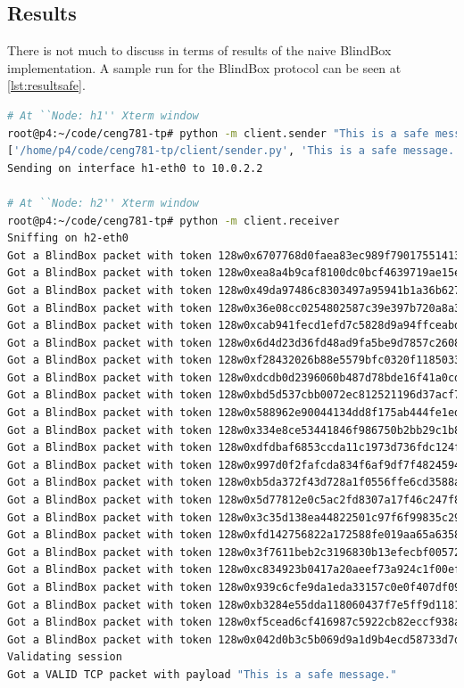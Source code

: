 \documentclass{winslabreport}
\begin{document}
\subsection{Results}

There is not much to discuss in terms of results of the naive BlindBox implementation. A sample run for the BlindBox protocol can be seen at \autoref{lst:resultsafe}.

\begin{lstlisting}[caption={A Safe Message},label={lst:resultsafe},language=bash]
# At ``Node: h1'' Xterm window
root@p4:~/code/ceng781-tp# python -m client.sender "This is a safe message."
['/home/p4/code/ceng781-tp/client/sender.py', 'This is a safe message.']
Sending on interface h1-eth0 to 10.0.2.2

# At ``Node: h2'' Xterm window
root@p4:~/code/ceng781-tp# python -m client.receiver
Sniffing on h2-eth0
Got a BlindBox packet with token 128w0x6707768d0faea83ec989f79017551413
Got a BlindBox packet with token 128w0xea8a4b9caf8100dc0bcf4639719ae15e
Got a BlindBox packet with token 128w0x49da97486c8303497a95941b1a36b627
Got a BlindBox packet with token 128w0x36e08cc0254802587c39e397b720a8a3
Got a BlindBox packet with token 128w0xcab941fecd1efd7c5828d9a94ffceabd
Got a BlindBox packet with token 128w0x6d4d23d36fd48ad9fa5be9d7857c2608
Got a BlindBox packet with token 128w0xf28432026b88e5579bfc0320f1185033
Got a BlindBox packet with token 128w0xdcdb0d2396060b487d78bde16f41a0cd
Got a BlindBox packet with token 128w0xbd5d537cbb0072ec812521196d37acf7
Got a BlindBox packet with token 128w0x588962e90044134dd8f175ab444fe1ed
Got a BlindBox packet with token 128w0x334e8ce53441846f986750b2bb29c1b8
Got a BlindBox packet with token 128w0xdfdbaf6853ccda11c1973d736fdc124f
Got a BlindBox packet with token 128w0x997d0f2fafcda834f6af9df7f4824594
Got a BlindBox packet with token 128w0xb5da372f43d728a1f0556ffe6cd3588a
Got a BlindBox packet with token 128w0x5d77812e0c5ac2fd8307a17f46c247f8
Got a BlindBox packet with token 128w0x3c35d138ea44822501c97f6f99835c29
Got a BlindBox packet with token 128w0xfd142756822a172588fe019aa65a6358
Got a BlindBox packet with token 128w0x3f7611beb2c3196830b13efecbf00572
Got a BlindBox packet with token 128w0xc834923b0417a20aeef73a924c1f00ef
Got a BlindBox packet with token 128w0x939c6cfe9da1eda33157c0e0f407df09
Got a BlindBox packet with token 128w0xb3284e55dda118060437f7e5ff9d1181
Got a BlindBox packet with token 128w0xf5cead6cf416987c5922cb82eccf938a
Got a BlindBox packet with token 128w0x042d0b3c5b069d9a1d9b4ecd58733d7d
Validating session
Got a VALID TCP packet with payload "This is a safe message."
\end{lstlisting}
\end{document}

